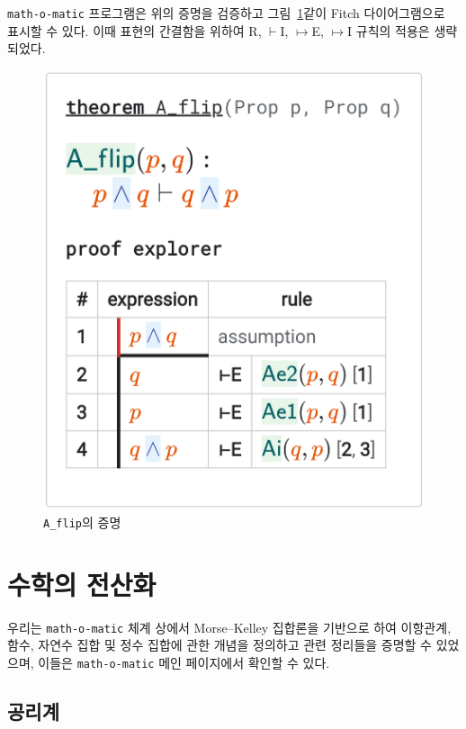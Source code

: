 \documentclass[10pt,twocolumn]{article}
\theoremstyle{definition}
\begin{document}
\texttt{math-o-matic} 프로그램은 위의 증명을 검증하고 그림~\ref{fig:Aflip}\과 같이 Fitch 다이어그램으로 표시할 수 있다. 이때 표현의 간결함을 위하여 R, $\vdash$I, $\mapsto$E, $\mapsto$I 규칙의 적용은 생략되었다.

\begin{figure}[hbt!] \centering
	\includegraphics[scale=.18]{A_flip}
	\caption{\texttt{A\_flip}의 증명} \label{fig:Aflip}
\end{figure}


\section{수학의 전산화}

우리는 \texttt{math-o-matic} 체계 상에서 Morse--Kelley 집합론을 기반으로 하여 이항관계, 함수, 자연수 집합 및 정수 집합에 관한 개념을 정의하고 관련 정리들을 증명할 수 있었으며, 이들은 \texttt{math-o-matic} 메인 페이지에서 확인할 수 있다.

\subsection{공리계}
\end{document}
